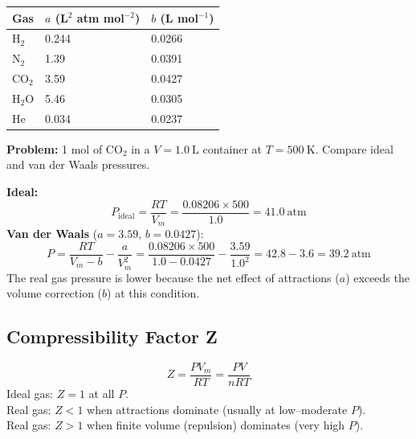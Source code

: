 \documentclass[12pt,a4paper]{article}
\begin{document}
\begin{tabularx}{\linewidth}{|B{2.4cm}|Y|Y|}
\hline
\textbf{Gas} & \textbf{$a$ (L$^2$ atm mol$^{-2}$)} & \textbf{$b$ (L mol$^{-1}$)} \\
\hline
$\mathrm{H_2}$ & 0.244 & 0.0266 \\
\hline
$\mathrm{N_2}$ & 1.39  & 0.0391 \\
\hline
$\mathrm{CO_2}$ & 3.59 & 0.0427 \\
\hline
$\mathrm{H_2O}$ & 5.46 & 0.0305 \\
\hline
$\mathrm{He}$ & 0.034 & 0.0237 \\
\hline
\end{tabularx}

\begin{tcolorbox}[examplebox, title={Solved Example: Pressure of Real vs Ideal Gas}]
\textbf{Problem:} 1 mol of $\mathrm{CO_2}$ in a $V=1.0\ \mathrm{L}$ container at $T=500\ \mathrm{K}$. Compare ideal and van der Waals pressures.

\textbf{Ideal:}
\[
P_{\mathrm{ideal}} = \frac{RT}{V_m} = \frac{0.08206\times500}{1.0} = 41.0\ \mathrm{atm}
\]
\textbf{Van der Waals} ($a=3.59$, $b=0.0427$):
\[
P = \frac{RT}{V_m - b} - \frac{a}{V_m^2} = \frac{0.08206\times500}{1.0-0.0427} - \frac{3.59}{1.0^2}
= 42.8 - 3.6 = \mathbf{39.2}\ \mathrm{atm}
\]
The real gas pressure is lower because the net effect of attractions ($a$) exceeds the volume correction ($b$) at this condition.
\end{tcolorbox}

\subsection{Compressibility Factor Z}
\begin{tcolorbox}[formulabox, title={Compressibility Factor}]
\[
Z = \frac{PV_m}{RT} = \frac{PV}{nRT}
\]
Ideal gas: $Z = 1$ at all $P$.\\
Real gas: $Z < 1$ when attractions dominate (usually at low--moderate $P$).\\
Real gas: $Z > 1$ when finite volume (repulsion) dominates (very high $P$).
\end{tcolorbox}
\end{document}
